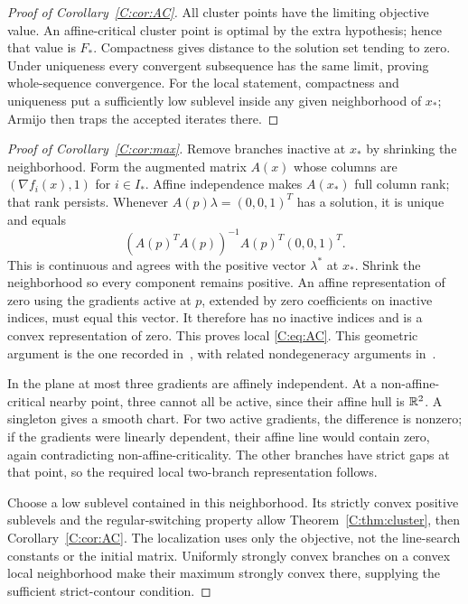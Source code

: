 \begin{proof}[Proof of Corollary~\ref{C:cor:AC}]
All cluster points have the limiting objective value. An affine-critical cluster point is optimal by the extra hypothesis; hence that value is $F_*$. Compactness gives distance to the solution set tending to zero. Under uniqueness every convergent subsequence has the same limit, proving whole-sequence convergence. For the local statement, compactness and uniqueness put a sufficiently low sublevel inside any given neighborhood of $x_*$; Armijo then traps the accepted iterates there.
\end{proof}

\begin{proof}[Proof of Corollary~\ref{C:cor:max}]
Remove branches inactive at $x_*$ by shrinking the neighborhood. Form the augmented matrix $A(x)$ whose columns are $(\nabla f_i(x),1)$ for $i\in I_*$. Affine independence makes $A(x_*)$ full column rank; that rank persists. Whenever $A(p)\lambda=(0,0,1)^T$ has a solution, it is unique and equals
\[
 (A(p)^TA(p))^{-1}A(p)^T(0,0,1)^T.
\]
This is continuous and agrees with the positive vector $\lambda^*$ at $x_*$. Shrink the neighborhood so every component remains positive. An affine representation of zero using the gradients active at $p$, extended by zero coefficients on inactive indices, must equal this vector. It therefore has no inactive indices and is a convex representation of zero. This proves local \eqref{C:eq:AC}. This geometric argument is the one recorded in~\cite{SA}, with related nondegeneracy arguments in~\cite{BG}.

In the plane at most three gradients are affinely independent. At a non-affine-critical nearby point, three cannot all be active, since their affine hull is $\mathbb R^2$. A singleton gives a smooth chart. For two active gradients, the difference is nonzero; if the gradients were linearly dependent, their affine line would contain zero, again contradicting non-affine-criticality. The other branches have strict gaps at that point, so the required local two-branch representation follows.

Choose a low sublevel contained in this neighborhood. Its strictly convex positive sublevels and the regular-switching property allow Theorem~\ref{C:thm:cluster}, then Corollary~\ref{C:cor:AC}. The localization uses only the objective, not the line-search constants or the initial matrix. Uniformly strongly convex branches on a convex local neighborhood make their maximum strongly convex there, supplying the sufficient strict-contour condition.
\end{proof}

